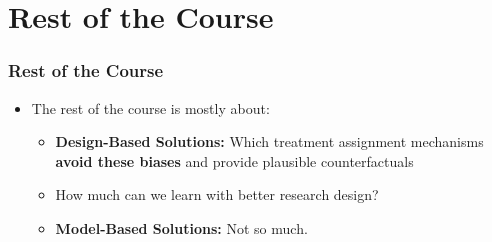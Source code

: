 \documentclass[xcolor=x11names,compress]{beamer}\usepackage[]{graphicx}\usepackage[]{color}
\renewcommand{\(}{\begin{columns}}
\renewcommand{\)}{\end{columns}}
\newcommand{\<}[1]{\begin{column}{#1}}
\renewcommand{\>}{\end{column}}
\begin{document}


\section{Rest of the Course}

\begin{frame}
\frametitle{Rest of the Course}
\begin{itemize}
\item The rest of the course is mostly about:
\begin{itemize}
\item \textbf{Design-Based Solutions:} Which treatment assignment mechanisms \textbf{avoid these biases} and provide plausible counterfactuals
\pause
\item How much can we learn with better research design?
\pause
\item \textbf{Model-Based Solutions:} Not so much.
\end{itemize}
\end{itemize}
\end{frame}
\end{document}
